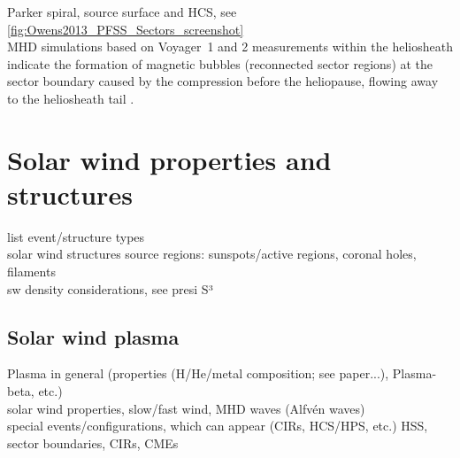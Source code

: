 Parker spiral, source surface and HCS, see \autoref{fig:Owens2013_PFSS_Sectors_screenshot}\\

MHD simulations based on Voyager~1 and 2 measurements within the heliosheath indicate the formation of magnetic bubbles (reconnected sector regions) at the sector boundary caused by the compression before the heliopause, flowing away to the heliosheath tail \citep{Opher2011}.\\


\section{Solar wind properties and structures}

list event/structure types\\
solar wind structures source regions: sunspots/active regions, coronal holes, filaments\\

sw density considerations, see presi S³\\

\subsection{Solar wind plasma}
\label{sec:solar_wind_plasma}

Plasma in general (properties (H/He/metal composition; see paper...), Plasma-beta, etc.)\\
	solar wind properties, slow/fast wind, MHD waves (Alfv\'en waves)\\

special events/configurations, which can appear (CIRs, HCS/HPS, etc.)
HSS, sector boundaries, CIRs, CMEs\\


